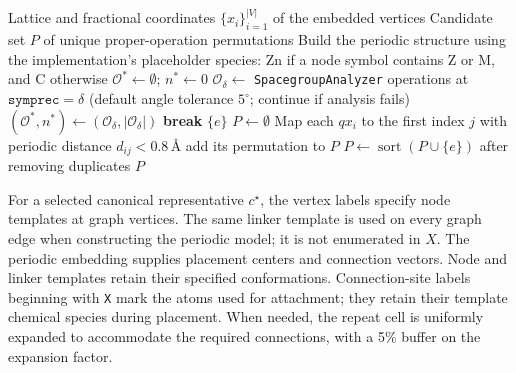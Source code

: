 \documentclass[a5paper, 10pt]{article}
\begin{document}
\begin{algorithm}[htbp]
\caption{Numerical generation of candidate embedded-net permutations}
\label{alg:gamma_construction}
\scriptsize
\begin{algorithmic}[1]
\Require Lattice and fractional coordinates $\{x_i\}_{i=1}^{|V|}$ of the embedded vertices
\Ensure Candidate set $P$ of unique proper-operation permutations
\State Build the periodic structure using the implementation's placeholder species: Zn if a node symbol contains Z or M, and C otherwise
\State $\mathcal{O}^*\gets\emptyset$; $n^*\gets0$
    \State $\mathcal{O}_{\delta}\gets$ \texttt{SpacegroupAnalyzer} operations at $\texttt{symprec}=\delta$ (default angle tolerance $5^\circ$; continue if analysis fails)
        \State $(\mathcal{O}^*,n^*)\gets(\mathcal{O}_{\delta},|\mathcal{O}_{\delta}|)$
    \EndIf
     \State \textbf{break} \EndIf
\EndFor
{} \State \Return $\{e\}$ \EndIf
\State $P\gets\emptyset$
    \State Map each $q x_i$ to the first index $j$ with periodic distance $d_{ij}<0.8\,\text{\AA}$
     \State add its permutation to $P$ \EndIf
\EndFor
\State $P\gets\operatorname{sort}(P\cup\{e\})$ after removing duplicates
\State \Return $P$
\end{algorithmic}
\end{algorithm}

For a selected canonical representative $c^\star$, the vertex labels specify node templates at graph vertices. The same linker template is used on every graph edge when constructing the periodic model; it is not enumerated in $X$. The periodic embedding supplies placement centers and connection vectors. Node and linker templates retain their specified conformations. Connection-site labels beginning with \texttt{X} mark the atoms used for attachment; they retain their template chemical species during placement. When needed, the repeat cell is uniformly expanded to accommodate the required connections, with a 5\% buffer on the expansion factor.
\end{document}

